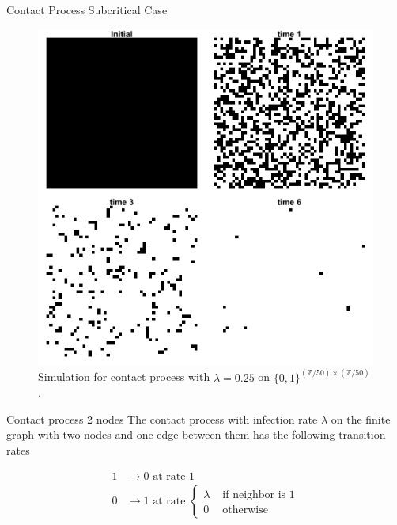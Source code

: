 \documentclass{beamer}
\theoremstyle{definition}
\newcommand{\Z}{\mathbb{Z}}
\begin{document}
\begin{frame}{Contact Process Subcritical Case}
\begin{figure}[H]
  \centering
    \includegraphics[width=.65\textwidth]{figures/contact_simulation_torus_25_below_crit.png}
   \caption{Simulation for contact process with $\lambda = 0.25$ on $\{0,1\}^{(\Z/50) \times (\Z/50)}$.}
  \label{fig:contact_sim_torus_below_crit.png}
\end{figure}
\end{frame}

\begin{frame}{Contact process 2 nodes}
The contact process with infection rate $\lambda$ on the finite graph with two nodes and one edge between them has the following transition rates

\begin{align*}
    1 &\to 0 \text{ at rate } 1\\
    0 &\to 1 \text{ at rate } \begin{cases}
        \lambda & \text{ if neighbor is 1}\\
        0 & \text{ otherwise}
    \end{cases}
\end{align*}

\begin{figure}
    \centering
\end{figure}

\end{frame}
\end{document}
